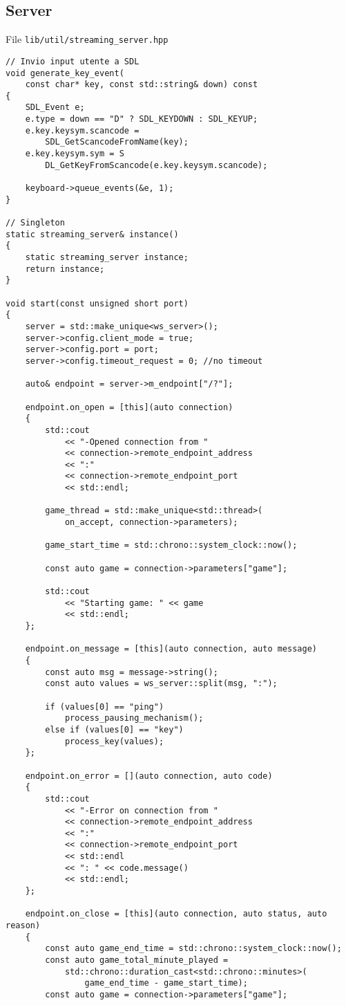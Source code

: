 \subsection{Server}
File \verb|lib/util/streaming_server.hpp|

\begin{verbatim}
// Invio input utente a SDL
void generate_key_event(
	const char* key, const std::string& down) const
{
	SDL_Event e;
	e.type = down == "D" ? SDL_KEYDOWN : SDL_KEYUP;
	e.key.keysym.scancode = 
		SDL_GetScancodeFromName(key);
	e.key.keysym.sym = S
		DL_GetKeyFromScancode(e.key.keysym.scancode);

	keyboard->queue_events(&e, 1);
}

// Singleton
static streaming_server& instance()
{
	static streaming_server instance;
	return instance;
}

void start(const unsigned short port)
{
	server = std::make_unique<ws_server>();
	server->config.client_mode = true;
	server->config.port = port;
	server->config.timeout_request = 0; //no timeout

	auto& endpoint = server->m_endpoint["/?"];

	endpoint.on_open = [this](auto connection)
	{
		std::cout
			<< "-Opened connection from "
			<< connection->remote_endpoint_address
			<< ":"
			<< connection->remote_endpoint_port
			<< std::endl;

		game_thread = std::make_unique<std::thread>(
			on_accept, connection->parameters);

		game_start_time = std::chrono::system_clock::now();

		const auto game = connection->parameters["game"];

		std::cout
			<< "Starting game: " << game
			<< std::endl;
	};

	endpoint.on_message = [this](auto connection, auto message)
	{
		const auto msg = message->string();
		const auto values = ws_server::split(msg, ":");

		if (values[0] == "ping")
			process_pausing_mechanism();
		else if (values[0] == "key")
			process_key(values);
	};

	endpoint.on_error = [](auto connection, auto code)
	{
		std::cout
			<< "-Error on connection from "
			<< connection->remote_endpoint_address
			<< ":"
			<< connection->remote_endpoint_port
			<< std::endl
			<< ": " << code.message()
			<< std::endl;
	};

	endpoint.on_close = [this](auto connection, auto status, auto reason)
	{
		const auto game_end_time = std::chrono::system_clock::now();
		const auto game_total_minute_played = 
			std::chrono::duration_cast<std::chrono::minutes>(
				game_end_time - game_start_time);
		const auto game = connection->parameters["game"];


\end{verbatim}
